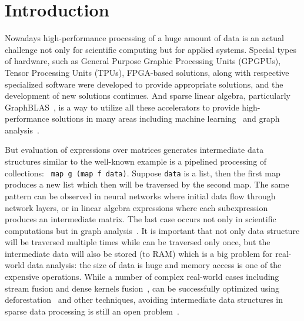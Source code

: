 \section{Introduction}

Nowadays high-performance processing of a huge amount of data is an actual challenge not only for scientific computing but for applied systems.
Special types of hardware, such as General Purpose Graphic Processing Units (GPGPUs), Tensor Processing Units (TPUs), FPGA-based solutions, along with respective specialized software were developed to provide appropriate solutions, and the development of new solutions continues.
And sparse linear algebra, particularly GraphBLAS~\cite{buluc2017graphblas}, is a way to utilize all these accelerators to provide high-performance solutions in many areas including machine learning~\cite{Kepner2017} and graph analysis~\cite{graphblast}.


But evaluation of expressions over matrices generates intermediate data structures similar to the well-known example is a pipelined processing of collections: \verb| map g (map f data)|. Suppose \verb|data| is a list, then the first map produces a new list which then will be traversed by the second map. The same pattern can be observed in neural networks where initial data flow through network layers, or in linear algebra expressions where each subexpression produces an intermediate matrix. The last case occurs not only in scientific computations but in graph analysis~\cite{graphblast}. It is important that not only data structure will be traversed multiple times while can be traversed only once, but the intermediate data will also be stored (to RAM) which is a big problem for real-world data analysis: the size of data is huge and memory access is one of the expensive operations.
While a number of complex real-world cases including stream fusion and dense kernels fusion~\cite{fusion-boosting-memory-computations}, can be successfully optimized using deforestation~\cite{wadler-deforestation,wadler-deforestation-ho} and other techniques, avoiding intermediate data structures in sparse data processing is still an open problem~\cite{graphblast}.